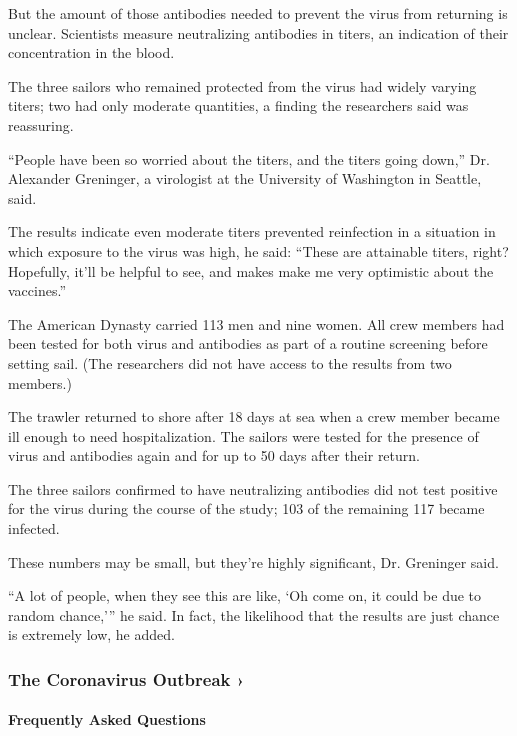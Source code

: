 But the amount of those antibodies needed to prevent the virus from
returning is unclear. Scientists measure neutralizing antibodies in
titers, an indication of their concentration in the blood.

The three sailors who remained protected from the virus had widely
varying titers; two had only moderate quantities, a finding the
researchers said was reassuring.

``People have been so worried about the titers, and the titers going
down,'' Dr. Alexander Greninger, a virologist at the University of
Washington in Seattle, said.

The results indicate even moderate titers prevented reinfection in a
situation in which exposure to the virus was high, he said: ``These are
attainable titers, right? Hopefully, it'll be helpful to see, and makes
make me very optimistic about the vaccines.''

The American Dynasty carried 113 men and nine women. All crew members
had been tested for both virus and antibodies as part of a routine
screening before setting sail. (The researchers did not have access to
the results from two members.)

The trawler returned to shore after 18 days at sea when a crew member
became ill enough to need hospitalization. The sailors were tested for
the presence of virus and antibodies again and for up to 50 days after
their return.

The three sailors confirmed to have neutralizing antibodies did not test
positive for the virus during the course of the study; 103 of the
remaining 117 became infected.

These numbers may be small, but they're highly significant, Dr.
Greninger said.

``A lot of people, when they see this are like, `Oh come on, it could be
due to random chance,''' he said. In fact, the likelihood that the
results are just chance is extremely low, he added.

\href{https://www.nytimes3xbfgragh.onion/news-event/coronavirus?action=click\&pgtype=Article\&state=default\&region=MAIN_CONTENT_3\&context=storylines_faq}{}

\hypertarget{the-coronavirus-outbreak-}{%
\subsubsection{The Coronavirus Outbreak
›}\label{the-coronavirus-outbreak-}}

\hypertarget{frequently-asked-questions}{%
\paragraph{Frequently Asked
Questions}\label{frequently-asked-questions}}

